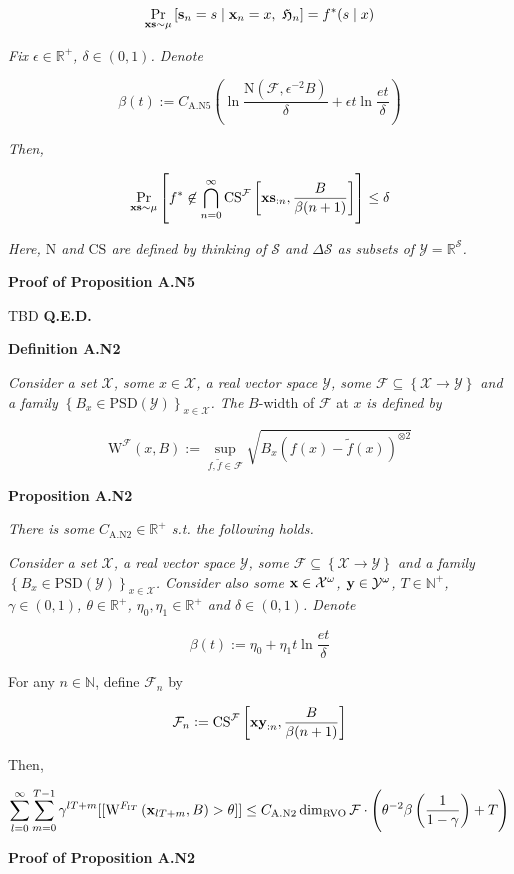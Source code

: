 \documentclass[a4paper]{article}
\newcommand{\Co}[1]{}
\newcommand{\AP}[1]{\left(#1\right)}
\newcommand{\AB}[1]{\left[#1\right]}
\newcommand{\AC}[1]{\left\{#1\right\}}
\newcommand{\ABM}[2]{\left[#1\;\middle\vert\;#2\right]}
\newcommand{\Pa}[2]{\underset{#1}{\operatorname{Pr}}\AB{#2}}
\newcommand{\CP}[3]{\underset{#1}{\operatorname{Pr}}\ABM{#2}{#3}}
\newcommand{\Nats}{\mathbb{N}}
\newcommand{\Reals}{\mathbb{R}}
\newcommand{\PSD}{\mathrm{PSD}}
\newcommand{\B}{B}
\newcommand{\X}{\mathcal{X}}
\newcommand{\Y}{\mathcal{Y}}
\newcommand{\F}{\mathcal{F}}
\newcommand{\St}{\mathcal{S}}
\DeclareMathOperator{\RVO}{\dim_{RVO}}
\newcommand{\N}{\mathrm{N}}
\newcommand{\CS}{\mathrm{CS}}
\newcommand{\W}{\mathrm{W}}
\begin{document}
$$\CP{\bold{xs}\sim\mu}{\bold{s}_n=s}{\bold{x}_n=x,\ \mathfrak{H}_n} = f^*(s\mid x)$$

\textit{Fix $\epsilon\in\Reals^+$, $\delta\in(0,1)$. Denote}\Co{i}

$$\beta(t):=C_{\mathrm{A.N5}}\AP{\ln{\frac{\N(\F,\epsilon^{-2}\B )}{\delta}}+\epsilon t\ln{\frac{et}{\delta}}}$$

\textit{Then,}\Co{i}

$$\Pa{\bold{xs}\sim\mu}{f^*\not\in\bigcap_{n=0}^\infty\CS^\F\AB{\bold{xs}_{:n},\frac{\B }{\beta(n+1)}}} \leq \delta$$

\textit{Here, $\N$ and $\CS$ are defined by thinking of $\St$ and $\Delta\St$ as subsets of $\Y=\Reals^\St$.}\Co{i}

\textbf{Proof of Proposition A.N5}\Co{b}

TBD \textbf{Q.E.D.}\Co{b}

\Co{b}

\textbf{Definition A.N2}\Co{b}

\textit{Consider a set $\X$, some $x\in\X$, a real vector space $\Y$, some $\F\subseteq\AC{\X\rightarrow\Y}$ and a family $\AC{\B _x\in\PSD(\Y)}_{x\in\X}$. The}\Co{i} $\B $-width of $\F$ at $x$ \textit{is defined by}\Co{i}

$$\W^\F(x,B):=\sup_{f,\tilde{f}\in\F}\sqrt{\B _x\AP{f(x)-\tilde{f}(x)}^{\otimes2}}$$  

\textbf{Proposition A.N2}\Co{b}

\textit{There is some $C_{\mathrm{A.N2}}\in\Reals^+$ s.t. the following holds.}\Co{i}

\textit{Consider a set $\X$, a real vector space $\Y$, some $\F\subseteq\AC{\X\rightarrow\Y}$ and a family $\AC{\B _x\in\PSD(\Y)}_{x\in\X}$. Consider also some $\bold{x}\in\X^\omega$, $\bold{y}\in\Y^\omega$, $T\in\Nats^+$, $\gamma\in(0,1)$, $\theta\in\Reals^+$, $\eta_0,\eta_1\in\Reals^+$ and $\delta\in(0,1)$. Denote}\Co{i}

$$\beta(t):=\eta_0 + \eta_1t\ln{\frac{et}{\delta}}$$

For any $n\in\Nats$, define $\F_n$ by

$$\F_n:=\CS^\F\AB{\bold{xy}_{:n},\frac{\B }{\beta(n+1)}}$$

Then,

$$\sum_{l=0}^\infty\sum_{m=0}^{T-1}{\gamma^{lT+m}[[\W^{F_{lT}}\AP{\bold{x}_{lT+m},B}>\theta]]} \leq C_{\mathrm{A.N2}}\RVO{\F}\cdot\AP{\theta^{-2}\beta\AP{\frac{1}{1-\gamma}}+T}$$

\textbf{Proof of Proposition A.N2}\Co{b}
\end{document}

